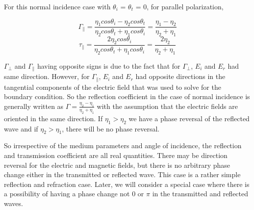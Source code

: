 For this normal incidence case with $\theta_{i}$ = $\theta_{t}$ = 0, for parallel polarization,

\begin{dmath*}
\Gamma_{\parallel} = \frac{\eta_{1} cos\theta_{i} - \eta_{2} cos\theta_{t}}{\eta_{2} cos\theta_{t} + \eta_{1} cos\theta_{i}}
= \frac{\eta_{1} -\eta_{2}}{\eta_{2} +\eta_{1}}
\end{dmath*}
\begin{dmath*}
\tau_{\parallel} = \frac{2\eta_{2} cos\theta_{i} }{\eta_{2} cos\theta_{t} + \eta_{1} cos\theta_{i}} 
= \frac{2\eta_{2}}{\eta_{2} + \eta_{1}}
\end{dmath*}

$\Gamma_{\perp}$ and $\Gamma_{\parallel}$ having opposite signs is due to the fact that for  $\Gamma_{\perp}$, $E_{i}$ and $E_{r}$ had same direction. However, for  $\Gamma_{\parallel}$, $E_{i}$ and $E_{r}$ had opposite directions in the tangential components of the electric field that was used to solve for the boundary condition. So the reflection coefficient in the case of normal incidence is generally written as $\Gamma = \frac{\eta_{2} - \eta_{1}}{\eta_{2} + \eta_{1}}$  with the assumption that the electric fields are oriented in the same direction. If $\eta_{1}>\eta_{2}$ we have a phase reversal of the reflected wave and if $\eta_{2}>\eta_{1}$, there will be no phase reversal. 

So irrespective of the medium parameters and angle of incidence, the reflection and transmission coefficient are all real quantities. There may be direction reversal for the electric and magnetic fields,  but there is no arbitrary phase change either in the transmitted or reflected wave. This case is a rather simple reflection and refraction case. Later, we will consider a special case where there is a possibility of having a phase change not $0$ or $\pi$ in the transmitted and reflected waves.

